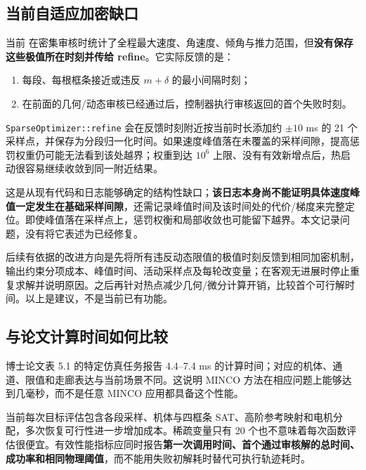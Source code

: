 \documentclass[UTF8,fontset=fandol,a4paper,10pt]{ctexart}
\newcommand{\code}[1]{{\small\nolinkurl{#1}}}
\newcommand{\file}[1]{{\small\path{#1}}}
\begin{document}
\subsection{当前自适应加密缺口}
当前 \file{src/optimizer.cpp} 在密集审核时统计了全程最大速度、角速度、倾角与推力范围，但\textbf{没有保存这些极值所在时刻并传给 refine}。它实际反馈的是：
\begin{enumerate}
\item 每段、每根框条接近或违反 $m+\delta$ 的最小间隔时刻；
\item 在前面的几何/动态审核已经通过后，控制器执行审核返回的首个失败时刻。
\end{enumerate}
\code{SparseOptimizer::refine} 会在反馈时刻附近按当前时长添加约 $\pm10$ ms 的 21 个采样点，并保存为分段归一化时间。如果速度峰值落在未覆盖的采样间隙，提高惩罚权重仍可能无法看到该处越界；权重到达 $10^6$ 上限、没有有效新增点后，热启动很容易继续收敛到同一附近结果。

这是从现有代码和日志能够确定的结构性缺口；\textbf{该日志本身尚不能证明具体速度峰值一定发生在基础采样间隙}，还需记录峰值时间及该时间处的代价/梯度来完整定位。即使峰值落在采样点上，惩罚权衡和局部收敛也可能留下越界。本文记录问题，没有将它表述为已经修复。

后续有依据的改进方向是先将所有违反动态限值的极值时刻反馈到相同加密机制，输出约束分项成本、峰值时间、活动采样点及每轮改变量；在客观无进展时停止重复求解并说明原因。之后再针对热点减少几何/微分计算开销，比较首个可行解时间。以上是建议，不是当前已有功能。

\subsection{与论文计算时间如何比较}
博士论文表 5.1 的特定仿真任务报告 4.4--7.4 ms 的计算时间；对应的机体、通道、限值和走廊表达与当前场景不同\cite{thesis}。这说明 MINCO 方法在相应问题上能够达到几毫秒，而不是任意 MINCO 应用都具备这个性能。

当前每次目标评估包含各段采样、机体与四框条 SAT、高阶参考映射和电机分配，多次恢复可行性进一步增加成本。稀疏变量只有 20 个也不意味着每次函数评估很便宜。有效性能指标应同时报告\textbf{第一次调用时间、首个通过审核解的总时间、成功率和相同物理阈值}，而不能用失败初解耗时替代可执行轨迹耗时。
\end{document}
